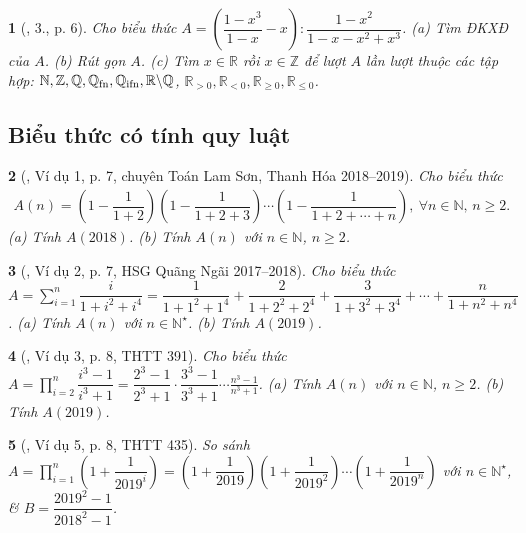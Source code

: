 \documentclass{article}
\newtheorem{baitoan}{}
\begin{document}
\begin{baitoan}[\cite{Lam_An_Tuan_Toan_9_dai_so}, 3., p. 6]
	Cho biểu thức $A = \left(\dfrac{1 - x^3}{1  - x} - x\right):\dfrac{1 - x^2}{1 - x - x^2 + x^3}$. (a) Tìm {\rm ĐKXĐ} của $A$. (b) Rút gọn $A$. (c) Tìm $x\in\mathbb{R}$ rồi $x\in\mathbb{Z}$ để lượt $A$ lần lượt thuộc các tập hợp:  $\mathbb{N},\mathbb{Z},\mathbb{Q},\mathbb{Q}_{\rm fn},\mathbb{Q}_{\rm ifn},\mathbb{R}\backslash\mathbb{Q}$, $\mathbb{R}_{> 0},\mathbb{R}_{< 0},\mathbb{R}_{\ge0},\mathbb{R}_{\le0}$.
\end{baitoan}

\subsection{Biểu thức có tính quy luật}

\begin{baitoan}[\cite{Lam_An_Tuan_Toan_9_dai_so}, Ví dụ 1, p. 7, chuyên Toán Lam Sơn, Thanh Hóa 2018--2019]
	Cho biểu thức
	\begin{align*}
		A(n) = \left(1 - \dfrac{1}{1 + 2}\right)\left(1 - \dfrac{1}{1 + 2 + 3}\right)\cdots\left(1 - \dfrac{1}{1 + 2 + \cdots + n}\right),\ \forall n\in\mathbb{N},\,n\ge 2.
	\end{align*}
	(a) Tính $A(2018)$. (b) Tính $A(n)$ với $n\in\mathbb{N}$, $n\ge2$.
\end{baitoan}

\begin{baitoan}[\cite{Lam_An_Tuan_Toan_9_dai_so}, Ví dụ 2, p. 7, HSG Quãng Ngãi 2017--2018]
	Cho biểu thức $A = \sum_{i=1}^n \dfrac{i}{1 + i^2 + i^4} = \dfrac{1}{1 + 1^2 + 1^4} + \dfrac{2}{1 + 2^2 + 2^4} + \dfrac{3}{1 + 3^2 + 3^4} + \cdots + \dfrac{n}{1 + n^2 + n^4}$. (a) Tính $A(n)$ với $n\in\mathbb{N}^\star$. (b) Tính $A(2019)$.
\end{baitoan}

\begin{baitoan}[\cite{Lam_An_Tuan_Toan_9_dai_so}, Ví dụ 3, p. 8, THTT 391]
	Cho biểu thức $A = \prod_{i=2}^n \dfrac{i^3 - 1}{i^3 + 1} = \dfrac{2^3 - 1}{2^3 + 1}\cdot\dfrac{3^3 - 1}{3^3 + 1}\cdots\frac{n^3 - 1}{n^3 + 1}$. (a) Tính $A(n)$ với $n\in\mathbb{N}$, $n\ge2$. (b) Tính $A(2019)$.
\end{baitoan}

\begin{baitoan}[\cite{Lam_An_Tuan_Toan_9_dai_so}, Ví dụ 5, p. 8, THTT 435]
	So sánh $A = \prod_{i=1}^n \left(1 + \dfrac{1}{2019^i}\right) = \left(1 + \dfrac{1}{2019}\right)\left(1 + \dfrac{1}{2019^2}\right)\cdots\left(1 + \dfrac{1}{2019^n}\right)$ với $n\in\mathbb{N}^\star$, \& $B = \dfrac{2019^2 - 1}{2018^2 - 1}$.
\end{baitoan}
\end{document}
